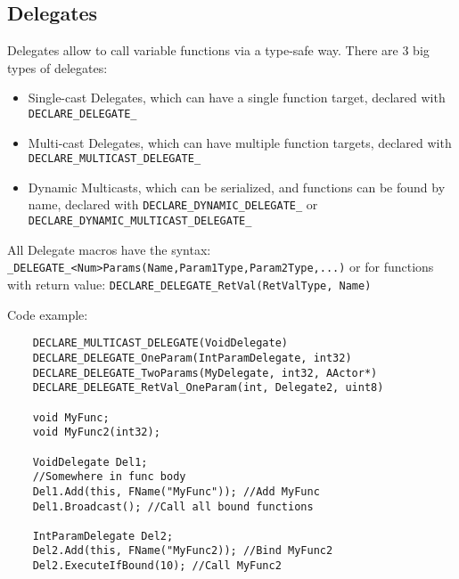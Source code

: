 \documentclass[10pt,a4paper]{article}
\begin{document}
\begin{multicols*}{2}
	\subsection{Delegates}
	Delegates allow to call variable functions via a type-safe way.
	There are 3 big types of delegates:
	\begin{itemize}
		\item Single-cast Delegates, which can have a single function target, declared with \verb|DECLARE_DELEGATE_|
		\item Multi-cast Delegates, which can have multiple function targets, declared with \verb|DECLARE_MULTICAST_DELEGATE_|
		\item Dynamic Multicasts, which can be serialized, and functions can be found by name, declared with \verb|DECLARE_DYNAMIC_DELEGATE_| or \verb|DECLARE_DYNAMIC_MULTICAST_DELEGATE_|
	\end{itemize}
	All Delegate macros have the syntax: \linebreak \verb|_DELEGATE_<Num>Params(Name,Param1Type,Param2Type,...)|
	or for functions with return value: \linebreak
	\verb|DECLARE_DELEGATE_RetVal(RetValType, Name)|
	
	Code example:
	
	\begin{verbatim}
	DECLARE_MULTICAST_DELEGATE(VoidDelegate)
	DECLARE_DELEGATE_OneParam(IntParamDelegate, int32)
	DECLARE_DELEGATE_TwoParams(MyDelegate, int32, AActor*)
	DECLARE_DELEGATE_RetVal_OneParam(int, Delegate2, uint8)
	
	void MyFunc;
	void MyFunc2(int32);
	
	VoidDelegate Del1;
	//Somewhere in func body
	Del1.Add(this, FName("MyFunc")); //Add MyFunc
	Del1.Broadcast(); //Call all bound functions
	
	IntParamDelegate Del2;
	Del2.Add(this, FName("MyFunc2)); //Bind MyFunc2
	Del2.ExecuteIfBound(10); //Call MyFunc2
	\end{verbatim}
	

\end{multicols*}
\end{document}
